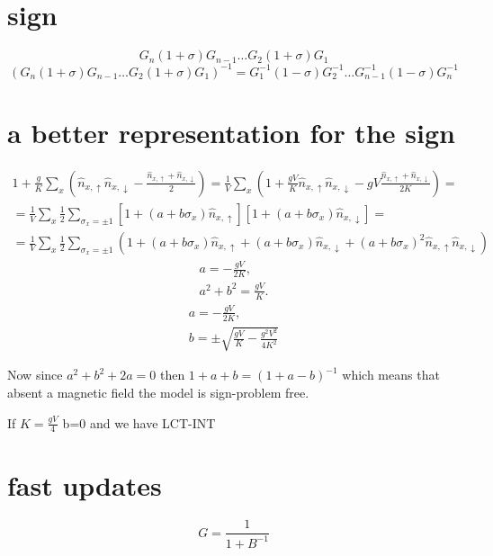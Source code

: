 \documentclass[onecolumn,english,prl,showpacs]{revtex4}
\newcommand{\Up}{{\uparrow}}
\newcommand{\Dn}{{\downarrow}}
\begin{document}
\section{sign}
\begin{equation}
 G_n(1+\sigma)G_{n-1}\ldots G_{2}(1+\sigma)G_1
\end{equation}
\begin{equation}
 (G_n(1+\sigma)G_{n-1}\ldots G_{2}(1+\sigma)G_1)^{-1} = G_1^{-1}(1-\sigma)G_{2}^{-1}\ldots G_{n-1}^{-1}(1-\sigma)G_n^{-1}
\end{equation}

\section{a better representation for the sign}

\begin{multline}
 1+\frac{g}{K} \sum_x (\hat{n}_{x, \Up} \hat{n}_{x,\Dn}-\frac{\hat{n}_{x, \Up}+\hat{n}_{x,\Dn}}{2}) = \frac{1}{V}\sum_x \left(1+\frac{gV}{K}\hat{n}_{x, \Up} \hat{n}_{x,\Dn}-gV\frac{\hat{n}_{x, \Up}+\hat{n}_{x,\Dn}}{2K}\right)=\\=
 \frac{1}{V}\sum_x \frac12 \sum_{\sigma_x=\pm1} \left[1+(a+b\sigma_x)\hat{n}_{x, \Up}\right]\left[1+(a+b\sigma_x) \hat{n}_{x,\Dn}\right]=\\=
 \frac{1}{V}\sum_x \frac12 \sum_{\sigma_x=\pm1} \left(1+(a+b\sigma_x)\hat{n}_{x, \Up}+(a+b\sigma_x) \hat{n}_{x,\Dn} + (a+b\sigma_x)^2\hat{n}_{x, \Up} \hat{n}_{x,\Dn} \right)
\end{multline}
\begin{eqnarray}
 a = -\frac{gV}{2K},\\
 a^2+b^2 = \frac{gV}{K}.
\end{eqnarray}
\begin{eqnarray}
 a = -\frac{gV}{2K},\\
 b = \pm\sqrt{\frac{gV}{K}-\frac{g^2V^2}{4K^2}}
\end{eqnarray}

Now since $a^2+b^2+2a=0$ then $1+a+b = (1+a-b)^{-1}$ which means that absent a magnetic field the model is sign-problem free.

If $K=\frac{gV}{4}$ b=0 and we have LCT-INT

\section{fast updates}

\begin{equation}
 G = \frac{1}{1+B^{-1}}
\end{equation}
\end{document}
